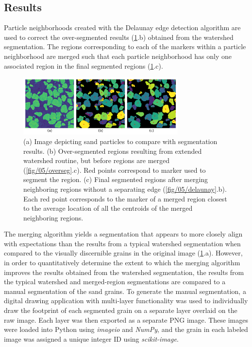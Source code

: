 \subsection{Results}
Particle neighborhoods created with the Delaunay edge detection algorithm
are used to correct the over-segmented results
(\ref{fig/05/merge-results}.b) obtained from the watershed
segmentation. The regions corresponding to each of the markers within a
particle neighborhood are merged such that each particle neighborhood has
only one associated region in the final segmented regions
(\ref{fig/05/merge-results}.c).

\begin{figure}[ht]
    \centering
    \includegraphics[width=0.75\textwidth]{figures/05/08-seg-results.png}
    \caption{
        \small{}
        (a) Image depicting sand particles to compare with segmentation
        results.
        (b) Over-segmented regions resulting from extended watershed routine,
        but before regions are merged (\ref{fig/05/overseg}.c).
        Red points correspond to marker used to segment the region.
        (c) Final segmented regions after merging neighboring regions without
        a separating edge (\ref{fig/05/delaunay}.b). Each red point
        corresponds to the marker of a merged region closest to the average
        location of all the centroids of the merged neighboring regions.
    }
    \label{fig/05/merge-results}
\end{figure}

The merging algorithm yields a segmentation that appears to more closely align with
expectations than the results from a typical watershed segmentation when
compared to the visually discernible grains in the original image
(\ref{fig/05/merge-results}.a). However,
in order to quantitatively determine the extent to which the merging algorithm
improves the results obtained from the watershed segmentation, the results from
the typical watershed and merged-region segmentations are compared to a manual
segmentation of the sand grains.
To generate the manual segmentation, a digital drawing application
with multi-layer functionality was used to individually draw the footprint of
each segmented grain on a separate layer overlaid on the raw image.
Each layer was then exported as a separate PNG image. These images were loaded into
Python using \textit{imageio} and \textit{NumPy}, and the grain in each
labeled image was assigned a unique integer ID using \textit{scikit-image}.

